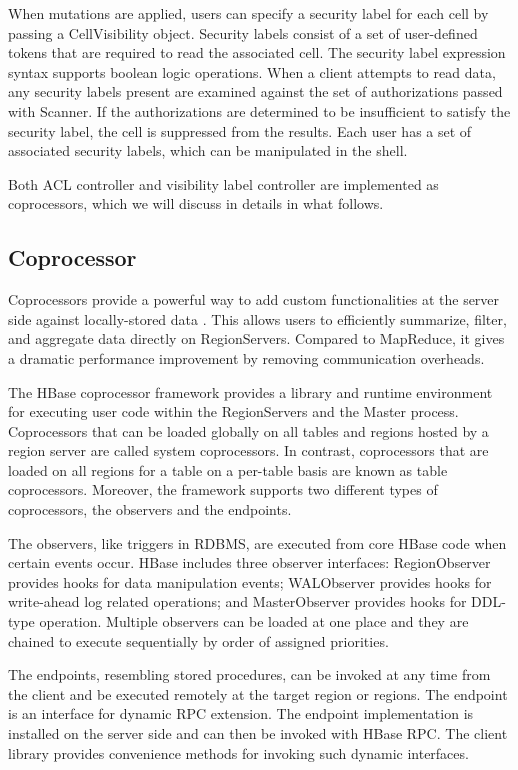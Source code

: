 \documentclass[12pt]{book}
\begin{document}
When mutations are applied, users can specify a security label for each cell by passing a CellVisibility object. Security labels consist of a set of user-defined tokens that are required to read the associated cell. The security label expression syntax supports boolean logic operations. When a client attempts to read data, any security labels present are examined against the set of authorizations passed with Scanner. If the authorizations are determined to be insufficient to satisfy the security label, the cell is suppressed from the results. Each user has a set of associated security labels, which can be manipulated in the shell.

Both ACL controller and visibility label controller are implemented as coprocessors, which we will discuss in details in what follows.

\subsection{Coprocessor}

Coprocessors provide a powerful way to add custom functionalities at the server side against locally-stored data \cite{HBaseCoprocessor}. This allows users to efficiently summarize, filter, and aggregate data directly on RegionServers. Compared to MapReduce, it gives a dramatic performance improvement by removing communication overheads. 

The HBase coprocessor framework provides a library and runtime environment for executing user code within the RegionServers and the Master process. Coprocessors that can be loaded globally on all tables and regions hosted by a region server are called system coprocessors. In contrast, coprocessors that are loaded on all regions for a table on a per-table basis are known as table coprocessors. Moreover, the framework supports two different types of coprocessors, the observers and the endpoints.

The observers, like triggers in RDBMS, are executed from core HBase code when certain events occur. HBase includes three observer interfaces: RegionObserver provides hooks for data manipulation events; WALObserver provides hooks for write-ahead log related operations; and MasterObserver provides hooks for DDL-type operation. Multiple observers can be loaded at one place and they are chained to execute sequentially by order of assigned priorities.

The endpoints, resembling stored procedures, can be invoked at any time from the client and be executed remotely at the target region or regions. The endpoint is an interface for dynamic RPC extension. The endpoint implementation is installed on the server side and can then be invoked with HBase RPC. The client library provides convenience methods for invoking such dynamic interfaces.
\end{document}
